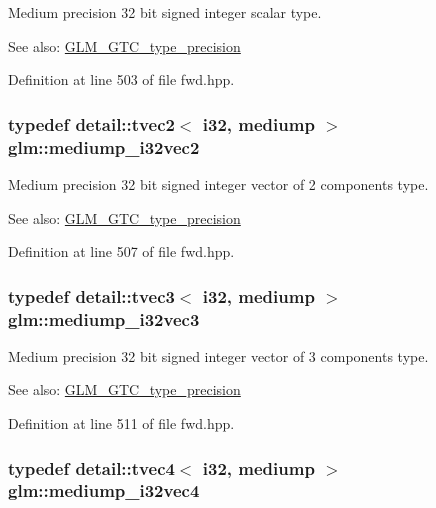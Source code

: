 Medium precision 32 bit signed integer scalar type. \begin{Desc}
\item[See also:]\hyperlink{group__gtc__type__precision}{GLM\_\-GTC\_\-type\_\-precision} \end{Desc}


Definition at line 503 of file fwd.hpp.\hypertarget{group__gtc__type__precision_gef7b37956ce9e1cc4faecf21b7fdae8b}{
\subsubsection[mediump\_\-i32vec2]{\setlength{\rightskip}{0pt plus 5cm}typedef detail::tvec2$<$ i32, mediump $>$ {\bf glm::mediump\_\-i32vec2}}}
\label{group__gtc__type__precision_gef7b37956ce9e1cc4faecf21b7fdae8b}


Medium precision 32 bit signed integer vector of 2 components type. \begin{Desc}
\item[See also:]\hyperlink{group__gtc__type__precision}{GLM\_\-GTC\_\-type\_\-precision} \end{Desc}


Definition at line 507 of file fwd.hpp.\hypertarget{group__gtc__type__precision_g768e62b66086bd85a438341eedfad651}{
\subsubsection[mediump\_\-i32vec3]{\setlength{\rightskip}{0pt plus 5cm}typedef detail::tvec3$<$ i32, mediump $>$ {\bf glm::mediump\_\-i32vec3}}}
\label{group__gtc__type__precision_g768e62b66086bd85a438341eedfad651}


Medium precision 32 bit signed integer vector of 3 components type. \begin{Desc}
\item[See also:]\hyperlink{group__gtc__type__precision}{GLM\_\-GTC\_\-type\_\-precision} \end{Desc}


Definition at line 511 of file fwd.hpp.\hypertarget{group__gtc__type__precision_g68126328090f37655d8218c5a5fb8ae5}{
\subsubsection[mediump\_\-i32vec4]{\setlength{\rightskip}{0pt plus 5cm}typedef detail::tvec4$<$ i32, mediump $>$ {\bf glm::mediump\_\-i32vec4}}}
\label{group__gtc__type__precision_g68126328090f37655d8218c5a5fb8ae5}


